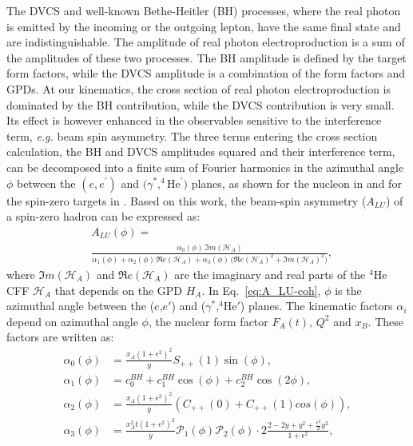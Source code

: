 \documentclass[twocolumn,nofootinbib,showpacs,prl,superscriptaddress,secnumarabic,amssymb,nobibnotes,aps,floatfix]{revtex4}
\begin{document}
The DVCS and well-known Bethe-Heitler (BH) processes, where the real 
photon is emitted by the incoming or the outgoing lepton, have the same final 
state and are indistinguishable. The amplitude of real photon 
electroproduction is a sum of the amplitudes of these two processes. The BH 
amplitude is defined by the target form factors, while the DVCS amplitude is 
a combination of the form factors and GPDs. At our kinematics, the cross 
section of real photon electroproduction is dominated by the BH 
contribution, while the DVCS contribution is very small. Its effect is however
enhanced in the observables sensitive to the interference term, {\it e.g.} 
beam spin asymmetry. The three terms entering the cross section calculation,
the BH and DVCS amplitudes squared and their interference term, 
can be decomposed into a finite sum of Fourier harmonics in the azimuthal angle
$\phi$ between the $(e,e^\prime)$ and $(\gamma^*,^4$He$^\prime)$ planes, as
shown for the nucleon in \cite{Belitsky:2001ns} and for the spin-zero targets
in \cite{Kirchner:2003wt,Belitsky:2008bz}. Based on this work, the beam-spin 
asymmetry ($A_{LU}$) of a spin-zero hadron can be expressed as:
\begin{equation}
\begin{split}
&A_{LU}(\phi) = \\
&\frac{\alpha_{0}(\phi) \, \Im m(\mathcal{H}_{A})}
{\alpha_{1}(\phi) + \alpha_{2}(\phi) \, \Re e(\mathcal{H}_{A}) + \alpha_{3}(\phi) \, 
\big( \Re e(\mathcal{H}_{A})^{2} + \Im m(\mathcal{H}_{A})^{2} \big)},
\end{split}
\label{eq:A_LU-coh}
\end{equation}
where $\Im m(\mathcal{H}_{A})$ and $\Re e(\mathcal{H}_{A})$ are the imaginary 
and real parts of the $^4$He CFF $\mathcal{H}_{A}$ that depends on the GPD 
$H_A$. In Eq.~\ref{eq:A_LU-coh}, $\phi$ is the azimuthal angle between the 
($e$,$e'$) and ($\gamma^{*}$,$^4$He$'$) planes. The kinematic factors $\alpha_i$
depend on azimuthal angle $\phi$, the nuclear form factor 
$F_A(t)$, $Q^2$ and $x_B$. These factors are written as:
\begin{align}
   \alpha_0 (\phi) & = \frac{x_{A}(1+\epsilon^2)^2}{y} S_{++}(1) \sin(\phi), \\
   \alpha_1 (\phi) & = c_0^{BH}+c_1^{BH} \cos({\phi})+c_2^{BH} \cos(2\phi), \\ 
   \alpha_2 (\phi) & = \frac{x_{A}(1+\epsilon^2)^2}{y}  \left( 
      C_{++}(0) +  C_{++}(1) cos(\phi) \right), \\
   \alpha_3 (\phi) &= \frac{x^{2}_{A}t(1+\epsilon^2)^2}{y} {\mathcal P}_1(\phi) 
      {\mathcal P}_2(\phi) \cdot 2 \frac{2-2y+y^2 + \frac{\epsilon^2}{2}y^2}{1 + 
      \epsilon^2},
\end{align}
\end{document}
